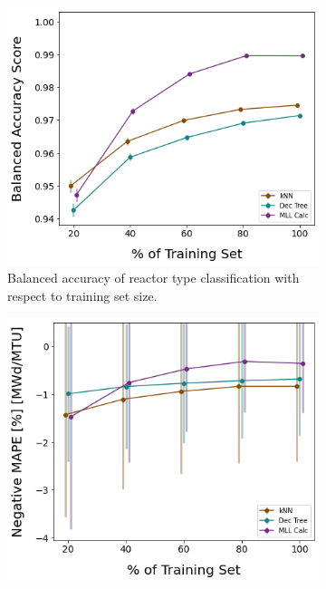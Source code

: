 \begin{figure}[!htb]
  \centering
  \begin{subfigure}[b]{0.495\textwidth}
    \centering
    \includegraphics[width=\textwidth]{./chapters/exp1/learncurve_nuc29_err05_BalAcc_rxtr.png}
    \caption{Balanced accuracy of reactor type classification with respect 
             to training set size.}
    \label{fig:learnsA}
  \end{subfigure}
  \hfill
  \begin{subfigure}[b]{0.485\textwidth}
    \centering
    \includegraphics[width=\textwidth]{./chapters/exp1/learncurve_nuc29_err05_MAPE_burn.png}

\end{subfigure}
\end{figure}
